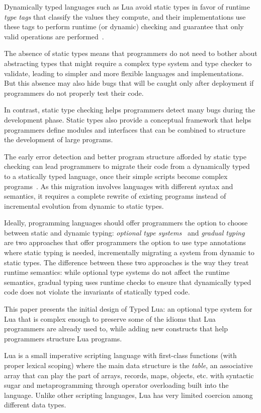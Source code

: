 \documentclass[preprint]{sig-alternate}
\begin{document}
Dynamically typed languages such as Lua avoid static types in favor of
runtime {\em type tags} that classify the values they compute, and
their implementations use these tags to perform runtime (or dynamic)
checking and guarantee that only valid operations are
performed~\citep{pierce2002tpl}.

The absence of static types means that programmers do not need to
bother about abstracting types that might require a complex type
system and type checker to validate, leading to simpler and more flexible
languages and implementations. But this absence may also hide bugs
that will be caught only after deployment if programmers do not properly
test their code.

In contrast, static type checking helps programmers detect many 
bugs during the development phase. Static types also provide a
conceptual framework that helps programmers define modules
and interfaces that can be combined to structure the development
of large programs.

The early error detection and better program structure afforded by
static type checking can lead programmers to migrate their code from
a dynamically typed to a statically typed language, once their simple
scripts become complex programs~\citep{tobin-hochstadt2006ims}.
As this migration involves languages with different syntax and
semantics, it requires a complete rewrite of existing programs instead
of incremental evolution from dynamic to static types.

Ideally, programming languages should offer programmers the
option to choose between static and dynamic typing:
\textit{optional type systems}~\citep{bracha2004pluggable} and
\textit{gradual typing}~\citep{siek2006gradual} are two approaches
that offer programmers the option to use type annotations where static
typing is needed, incrementally migrating a system from dynamic
to static types. The difference between these two approaches is the
way they treat runtime semantics: while optional type systems
do not affect the runtime semantics,
gradual typing uses runtime checks to ensure that dynamically typed
code does not violate the invariants of statically typed code.

This paper presents the initial design of Typed Lua:
an optional type system for Lua that is complex enough to
preserve some of the idioms that Lua programmers are already
used to, while adding new constructs that help programmers
structure Lua programs.

Lua is a small imperative scripting language with first-class
functions (with proper lexical scoping) where the main data
structure is the {\em table}, an associative array that can
play the part of arrays, records, maps, objects, etc.
with syntactic sugar and metaprogramming through operator overloading built into
the language. Unlike other scripting languages, Lua has very
limited coercion among different data types.
\end{document}
